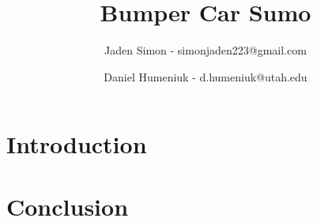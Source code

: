 \documentclass[11pt]{ieeeconf}
\title{Bumper Car Sumo}
\author{Jaden Simon - simonjaden223@gmail.com \\ \and
	   Daniel Humeniuk - d.humeniuk@utah.edu}
\begin{document}
\maketitle

\begin{abstract}

\end{abstract}

\section{Introduction}

\section{Conclusion}



%
\end{document}
